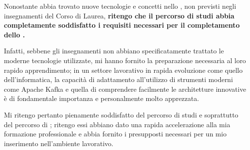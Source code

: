 Nonostante abbia trovato nuove tecnologie e concetti nello \stage, non previsti negli insegnamenti del Corso di Laurea, \textbf{ritengo che il percorso di studi abbia completamente soddisfatto i requisiti necessari per il completamento dello \stage.}

Infatti, sebbene gli insegnamenti non abbiano specificatamente trattato le moderne tecnologie utilizzate, mi hanno fornito la preparazione necessaria al loro  rapido apprendimento; in un settore lavorativo in rapida evoluzione come quello dell'informatica, la capacità di adattamento all'utilizzo di strumenti moderni come Apache Kafka e quella di comprendere facilmente le architetture innovative è di fondamentale importanza e personalmente molto apprezzata.

Mi ritengo pertanto pienamente soddisfatto del percorso di studi e soprattutto del percorso di \stage; ritengo essi abbiano dato una rapida accelerazione alla mia formazione professionale e abbia fornito i presupposti necessari per un mio inserimento nell'ambiente lavorativo.


